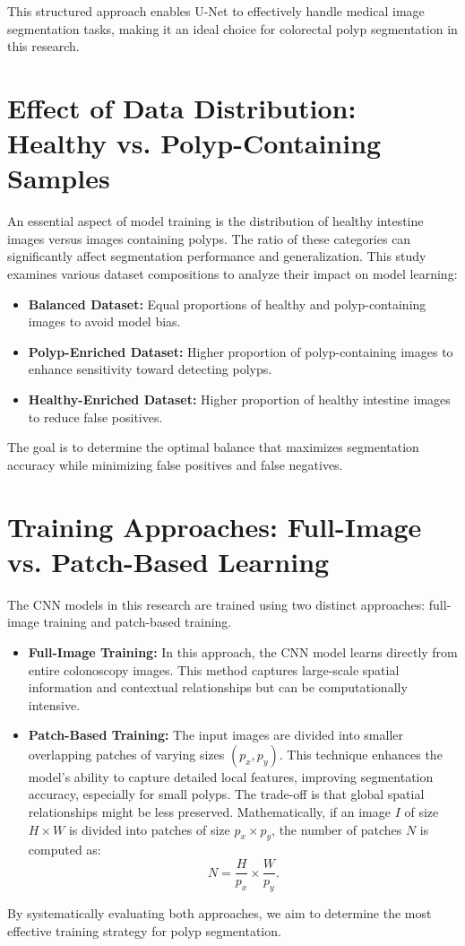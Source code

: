 This structured approach enables U-Net to effectively handle medical image segmentation tasks, making it an ideal choice for colorectal polyp segmentation in this research. 


\section{Effect of Data Distribution: Healthy vs. Polyp-Containing Samples}
An essential aspect of model training is the distribution of healthy intestine images versus images containing polyps. The ratio of these categories can significantly affect segmentation performance and generalization. This study examines various dataset compositions to analyze their impact on model learning:
\begin{itemize}
    \item \textbf{Balanced Dataset:} Equal proportions of healthy and polyp-containing images to avoid model bias.
    \item \textbf{Polyp-Enriched Dataset:} Higher proportion of polyp-containing images to enhance sensitivity toward detecting polyps.
    \item \textbf{Healthy-Enriched Dataset:} Higher proportion of healthy intestine images to reduce false positives.
\end{itemize}
The goal is to determine the optimal balance that maximizes segmentation accuracy while minimizing false positives and false negatives.


\section{Training Approaches: Full-Image vs. Patch-Based Learning}
The CNN models in this research are trained using two distinct approaches: full-image training and patch-based training. 

\begin{itemize}
    \item \textbf{Full-Image Training:} In this approach, the CNN model learns directly from entire colonoscopy images. This method captures large-scale spatial information and contextual relationships but can be computationally intensive.
    \item \textbf{Patch-Based Training:} The input images are divided into smaller overlapping patches of varying sizes \((p_x, p_y)\). This technique enhances the model's ability to capture detailed local features, improving segmentation accuracy, especially for small polyps. The trade-off is that global spatial relationships might be less preserved. Mathematically, if an image \(I\) of size \(H \times W\) is divided into patches of size \(p_x \times p_y\), the number of patches \(N\) is computed as:
    \begin{equation}
        N = \frac{H}{p_x} \times \frac{W}{p_y}.
    \end{equation}
\end{itemize}
By systematically evaluating both approaches, we aim to determine the most effective training strategy for polyp segmentation.

